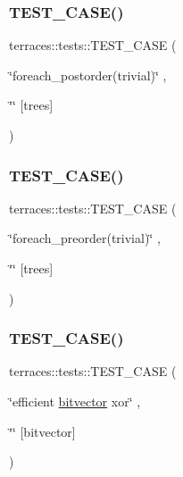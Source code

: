 \subsubsection{\texorpdfstring{T\+E\+S\+T\+\_\+\+C\+A\+S\+E()}{TEST\_CASE()}\hspace{0.1cm}{\footnotesize\ttfamily [72/78]}}
{\footnotesize\ttfamily terraces\+::tests\+::\+T\+E\+S\+T\+\_\+\+C\+A\+SE (\begin{DoxyParamCaption}\item[{\char`\"{}foreach\+\_\+postorder(trivial)\char`\"{}}]{,  }\item[{\char`\"{}\char`\"{}}]{\mbox{[}trees\mbox{]} }\end{DoxyParamCaption})}

\mbox{\label{namespaceterraces_1_1tests_af4ac7f65fe3e901f85a7ac11a37c6a68}} 
\subsubsection{\texorpdfstring{T\+E\+S\+T\+\_\+\+C\+A\+S\+E()}{TEST\_CASE()}\hspace{0.1cm}{\footnotesize\ttfamily [73/78]}}
{\footnotesize\ttfamily terraces\+::tests\+::\+T\+E\+S\+T\+\_\+\+C\+A\+SE (\begin{DoxyParamCaption}\item[{\char`\"{}foreach\+\_\+preorder(trivial)\char`\"{}}]{,  }\item[{\char`\"{}\char`\"{}}]{\mbox{[}trees\mbox{]} }\end{DoxyParamCaption})}

\mbox{\label{namespaceterraces_1_1tests_adfe3e28e69f3a10922a562179e6498b5}} 
\subsubsection{\texorpdfstring{T\+E\+S\+T\+\_\+\+C\+A\+S\+E()}{TEST\_CASE()}\hspace{0.1cm}{\footnotesize\ttfamily [74/78]}}
{\footnotesize\ttfamily terraces\+::tests\+::\+T\+E\+S\+T\+\_\+\+C\+A\+SE (\begin{DoxyParamCaption}\item[{\char`\"{}efficient \hyperlink{namespaceterraces_a1b526fb554dff829f7ad51eb21d5ed06}{bitvector} xor\char`\"{}}]{,  }\item[{\char`\"{}\char`\"{}}]{\mbox{[}bitvector\mbox{]} }\end{DoxyParamCaption})}

